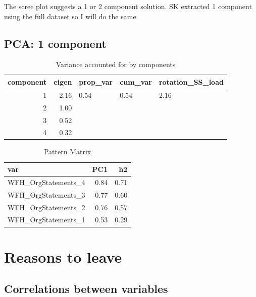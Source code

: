 \documentclass[]{article}
\begin{document}
The scree plot suggests a 1 or 2 component solution. SK extracted 1
component using the full dataset so I will do the same.

\hypertarget{pca-1-component-5}{%
\subsection{PCA: 1 component}\label{pca-1-component-5}}

\begin{table}[H]

\caption{\label{tab:unnamed-chunk-56}Variance accounted for by components}
\centering
\fontsize{6}{8}\selectfont
\begin{tabular}[t]{rrlll}
\toprule
component & eigen & prop\_var & cum\_var & rotation\_SS\_load\\
\midrule
1 & 2.16 & 0.54 & 0.54 & 2.16\\
2 & 1.00 &  &  & \\
3 & 0.52 &  &  & \\
4 & 0.32 &  &  & \\
\bottomrule
\end{tabular}
\end{table}

\begin{table}[H]

\caption{\label{tab:unnamed-chunk-56}Pattern Matrix}
\centering
\fontsize{6}{8}\selectfont
\begin{tabular}[t]{lrr}
\toprule
var & PC1 & h2\\
\midrule
WFH\_OrgStatements\_4 & 0.84 & 0.71\\
WFH\_OrgStatements\_3 & 0.77 & 0.60\\
WFH\_OrgStatements\_2 & 0.76 & 0.57\\
WFH\_OrgStatements\_1 & 0.53 & 0.29\\
\bottomrule
\end{tabular}
\end{table}

\newpage

\hypertarget{reasons-to-leave}{%
\section{Reasons to leave}\label{reasons-to-leave}}

\hypertarget{correlations-between-variables-11}{%
\subsection{Correlations between
variables}\label{correlations-between-variables-11}}
\end{document}
